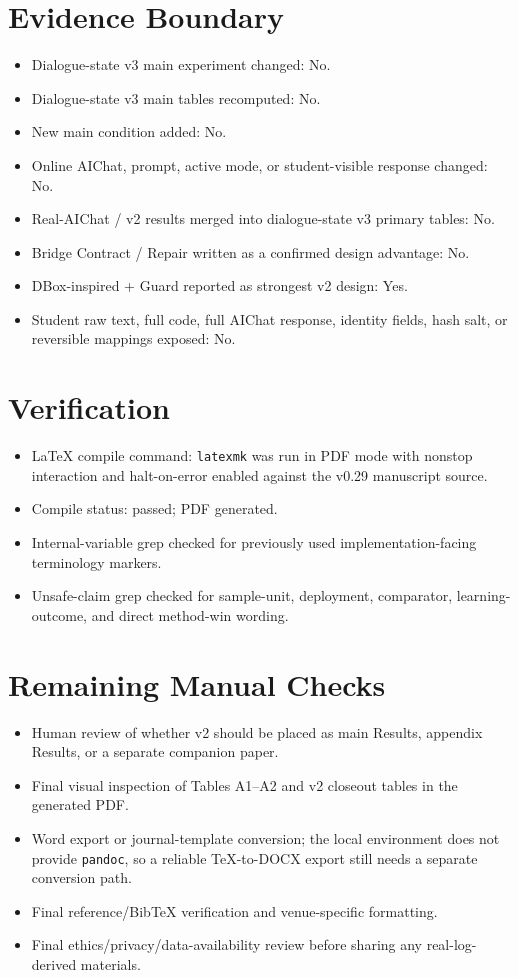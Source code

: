 \documentclass[11pt]{article}
\begin{document}
\section{Evidence Boundary}

\begin{itemize}
  \item Dialogue-state v3 main experiment changed: No.
  \item Dialogue-state v3 main tables recomputed: No.
  \item New main condition added: No.
  \item Online AIChat, prompt, active mode, or student-visible response changed: No.
  \item Real-AIChat / v2 results merged into dialogue-state v3 primary tables: No.
  \item Bridge Contract / Repair written as a confirmed design advantage: No.
  \item DBox-inspired + Guard reported as strongest v2 design: Yes.
  \item Student raw text, full code, full AIChat response, identity fields, hash salt, or reversible mappings exposed: No.
\end{itemize}

\section{Verification}

\begin{itemize}
  \item LaTeX compile command: \texttt{latexmk} was run in PDF mode with nonstop interaction and halt-on-error enabled against the v0.29 manuscript source.
  \item Compile status: passed; PDF generated.
  \item Internal-variable grep checked for previously used implementation-facing terminology markers.
  \item Unsafe-claim grep checked for sample-unit, deployment, comparator, learning-outcome, and direct method-win wording.
\end{itemize}

\section{Remaining Manual Checks}

\begin{itemize}
  \item Human review of whether v2 should be placed as main Results, appendix Results, or a separate companion paper.
  \item Final visual inspection of Tables A1--A2 and v2 closeout tables in the generated PDF.
  \item Word export or journal-template conversion; the local environment does not provide \texttt{pandoc}, so a reliable TeX-to-DOCX export still needs a separate conversion path.
  \item Final reference/BibTeX verification and venue-specific formatting.
  \item Final ethics/privacy/data-availability review before sharing any real-log-derived materials.
\end{itemize}
\end{document}
